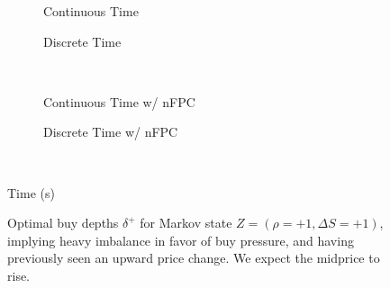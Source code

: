 \begin{figure}%
\centering%
\begin{subfigure}[b]{.4\linewidth}%
  \setlength\figureheight{\linewidth}%
  \setlength\figurewidth{\linewidth}%
  \caption{Continuous Time}%
\end{subfigure}%
\hspace{1.5cm}%
\begin{subfigure}[b]{.4\linewidth}%
  \setlength\figureheight{\linewidth}%
  \setlength\figurewidth{\linewidth}%
  \caption{Discrete Time}%
\end{subfigure}\\%
\vspace{1cm}%
\begin{subfigure}[b]{.4\linewidth}%
  \setlength\figureheight{\linewidth}%
  \setlength\figurewidth{\linewidth}%
  \caption{Continuous Time w/ nFPC}%
\end{subfigure}%
\hspace{1.5cm}%
\begin{subfigure}[b]{.4\linewidth}%
  \setlength\figureheight{\linewidth}%
  \setlength\figurewidth{\linewidth}%
  \caption{Discrete Time w/ nFPC}%
\end{subfigure}\\%
%
\leavevmode{}\hspace{0pt plus 1filll}\null%

Time (s)

\vspace{1cm}%
\begin{subfigure}{\linewidth}%
  \centering%
\end{subfigure}%
  \caption[Optimal buy LO depths for buy pressure imbalance]{Optimal buy depths $\delta^{+}$ for Markov state $Z=(\rho = +1, \Delta S = +1)$, implying heavy imbalance in favor of buy pressure, and having previously seen an upward price change. We expect the midprice to rise.}\label{fig:comp_dp_z15}%
\end{figure}

